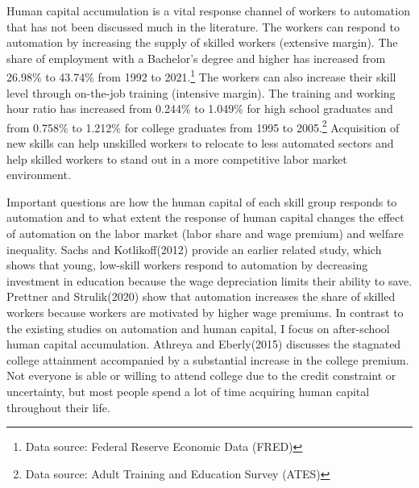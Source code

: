 \documentclass[12pt]{article}
\begin{document}
Human capital accumulation is a vital response channel of workers to automation that has not been discussed much in the literature. The workers can respond to automation by increasing the supply of skilled workers (extensive margin). The share of employment with a Bachelor's degree and higher has increased from 26.98\% to 43.74\% from 1992 to 2021.\footnote{Data source: Federal Reserve Economic Data (FRED)} The workers can also increase their skill level through on-the-job training (intensive margin). The training and working hour ratio has increased from 0.244\% to 1.049\% for high school graduates and from 0.758\% to 1.212\% for college graduates from 1995 to 2005.\footnote{Data source: Adult Training and Education Survey (ATES)} Acquisition of new skills can help unskilled workers to relocate to less automated sectors and help skilled workers to stand out in a more competitive labor market environment. 

Important questions are how the human capital of each skill group responds to automation and to what extent the response of human capital changes the effect of automation on the labor market (labor share and wage premium) and welfare inequality. Sachs and Kotlikoff(2012)\cite{SachsKotlikoff2012} provide an earlier related study, which shows that young, low-skill workers respond to automation by decreasing investment in education because the wage depreciation limits their ability to save. Prettner and Strulik(2020)\cite{PrettnerStrulik2020} show that automation increases the share of skilled workers because workers are motivated by higher wage premiums. In contrast to the existing studies on automation and human capital, I focus on after-school human capital accumulation. Athreya and Eberly(2015)\cite{AthreyaEberly2015} discusses the stagnated college attainment accompanied by a substantial increase in the college premium. Not everyone is able or willing to attend college due to the credit constraint or uncertainty, but most people spend a lot of time acquiring human capital throughout their life.
\end{document}
